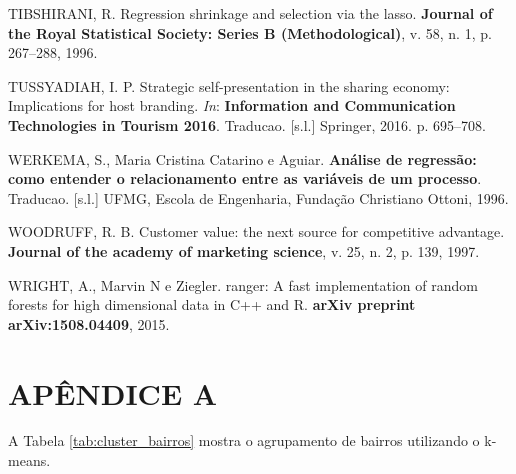 \documentclass[
	12pt,				%
	a4paper,		%
	oneside,    %
	chapter=TITLE,		   %
	section=TITLE,		   %
	subsection=TITLE,	   %
	subsubsection=TITLE, %
	english,			%
	french,				%
	spanish,			%
	brazil,				%
]{abntex2}
\begin{document}
\leavevmode\hypertarget{ref-tibshirani1996regression}{}%
TIBSHIRANI, R. Regression shrinkage and selection via the lasso.
\textbf{Journal of the Royal Statistical Society: Series B
(Methodological)}, v. 58, n. 1, p. 267--288, 1996.

\leavevmode\hypertarget{ref-tussyadiah2016strategic}{}%
TUSSYADIAH, I. P. Strategic self-presentation in the sharing economy:
Implications for host branding. \emph{In}: \textbf{Information and
Communication Technologies in Tourism 2016}. Traducao. {[}s.l.{]}
Springer, 2016. p. 695--708.

\leavevmode\hypertarget{ref-werkema1996analise}{}%
WERKEMA, S., Maria Cristina Catarino e Aguiar. \textbf{Análise de
regressão: como entender o relacionamento entre as variáveis de um
processo}. Traducao. {[}s.l.{]} UFMG, Escola de Engenharia, Fundação
Christiano Ottoni, 1996.

\leavevmode\hypertarget{ref-woodruff1997customer}{}%
WOODRUFF, R. B. Customer value: the next source for competitive
advantage. \textbf{Journal of the academy of marketing science}, v. 25,
n. 2, p. 139, 1997.

\leavevmode\hypertarget{ref-wright2015ranger}{}%
WRIGHT, A., Marvin N e Ziegler. ranger: A fast implementation of random
forests for high dimensional data in C++ and R. \textbf{arXiv preprint
arXiv:1508.04409}, 2015.

\hypertarget{apuxeandice-a}{%
\chapter*{APÊNDICE A}\label{apuxeandice-a}}

A Tabela \ref{tab:cluster_bairros} mostra o agrupamento de bairros
utilizando o k-means.
\end{document}
